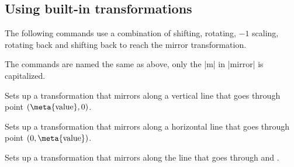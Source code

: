 \subsection{Using built-in transformations}
\label{pgflibrary:transformations:builtin}

The following commands use a combination of shifting, rotating, $-1$ scaling, rotating back and shifting back to reach the mirror transformation.

The commands are named the same as above, only the |m| in |mirror| is capitalized.


\begin{command}{\pgftransformxMirror{}}
  Sets up a transformation that mirrors along a vertical line that goes through point $(\text{\meta{value}}, 0)$.

\begin{codeexample}[preamble=\usepgflibrary{transformations.mirror}]
\end{codeexample}
\end{command}

\begin{command}{\pgftransformyMirror{}}
  Sets up a transformation that mirrors along a horizontal line that goes through point $(0, \text{\meta{value})}$.
\end{command}

\begin{command}{\pgftransformMirror{}}
  Sets up a transformation that mirrors along the line that goes through  and .
 
\begin{codeexample}[preamble=\usepgflibrary{transformations.mirror}]
\end{codeexample}
\end{command}

